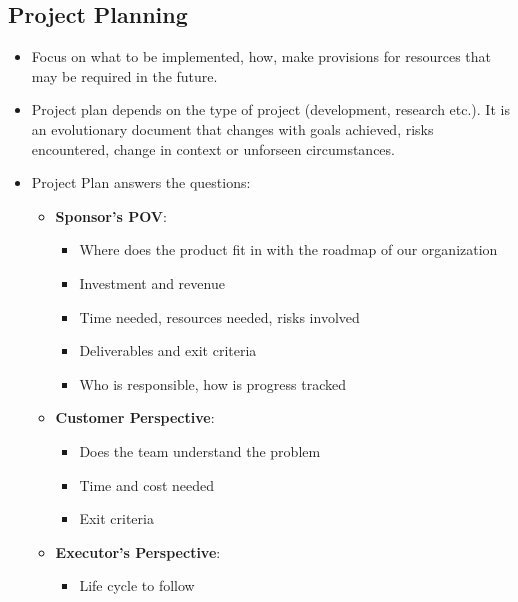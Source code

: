 \documentclass{article}
\begin{document}
\subsection{Project Planning}
\begin{itemize}
    \item Focus on what to be implemented, how, make provisions for resources that may be required in the future.
    
    \item Project plan depends on the type of project (development, research etc.). It is an evolutionary document that changes with goals achieved, risks encountered, change in context or unforseen circumstances.
    
    \item Project Plan answers the questions:
    \begin{itemize}
        \item \textbf{Sponsor's POV}:
        \begin{itemize}
            \item Where does the product fit in with the roadmap of our organization
            
            \item Investment and revenue
            
            \item Time needed, resources needed, risks involved
            
            \item Deliverables and exit criteria
            
            \item Who is responsible, how is progress tracked
        \end{itemize}
        
        \item \textbf{Customer Perspective}: 
        \begin{itemize}
            \item Does the team understand the problem
            
            \item Time and cost needed
            
            \item Exit criteria
        \end{itemize}
        
        \item \textbf{Executor's Perspective}:
        \begin{itemize}
            \item Life cycle to follow
            

\end{itemize}
\end{itemize}
\end{itemize}
\end{document}
